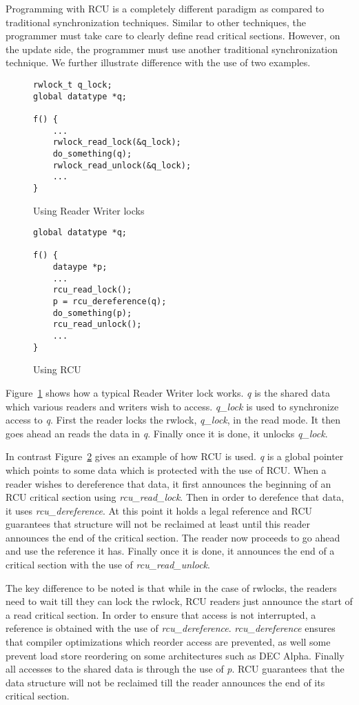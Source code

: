Programming with RCU is a completely different paradigm as compared to traditional
synchronization techniques. Similar to other techniques, the programmer must take care to clearly define
read critical sections. However, on the update side, the programmer must use another
traditional synchronization technique. We further illustrate difference with the
use of two examples.

\begin{figure}[t]
\centering
\begin{lstlisting}
rwlock_t q_lock;
global datatype *q;

f() {
	...
	rwlock_read_lock(&q_lock);
	do_something(q);
	rwlock_read_unlock(&q_lock);
	...
}
\end{lstlisting}
\caption{Using Reader Writer locks}\label{fig:rwuse}
\end{figure}

\begin{figure}[b]
\centering
\begin{lstlisting}
global datatype *q;

f() {
	dataype *p;
	...
	rcu_read_lock();
	p = rcu_dereference(q);
	do_something(p);
	rcu_read_unlock();
	...
}
\end{lstlisting}
\caption{Using RCU}\label{fig:RCUuse}
\end{figure}

Figure~\ref{fig:rwuse} shows how a
typical Reader Writer lock works. \emph{q} is the shared data which various readers
and writers wish to access. \emph{q\_lock} is used to synchronize access to \emph{q}.
First the reader locks the rwlock, \emph{q\_lock},
in the read mode. It then goes ahead an reads the data in \emph{q}. Finally once it is
done, it unlocks \emph{q\_lock}.

In contrast Figure~\ref{fig:RCUuse} gives an example of how RCU is used. \emph{q} is a global pointer
which points to some data which is protected with the use of RCU. When a reader
wishes to dereference that data, it first announces the beginning of an RCU critical
section using \emph{rcu\_read\_lock}. Then in order to derefence that data, it 
uses \emph{rcu\_dereference}. At this
point it holds a legal reference and RCU guarantees that structure will not be
reclaimed at least until this reader announces the end of the critical section.
The reader now proceeds to go ahead and use the reference it has. Finally once it
is done, it announces the end of a critical section with the use of \emph{rcu\_read\_unlock}.

The key difference to be noted is that while in the case of rwlocks, the readers
need to wait till they can lock the rwlock, RCU readers just announce the start
of a read critical section. In order to ensure that access is not interrupted,
a reference is obtained with the use of \emph{rcu\_dereference}. \emph{rcu\_dereference}
ensures that compiler optimizations which reorder access are prevented, as well
some prevent load store reordering on some architectures such as DEC Alpha.
Finally all accesses
to the shared data is through the use of \emph{p}. RCU guarantees that the data structure
will not be reclaimed till the reader announces the end of its critical section.


